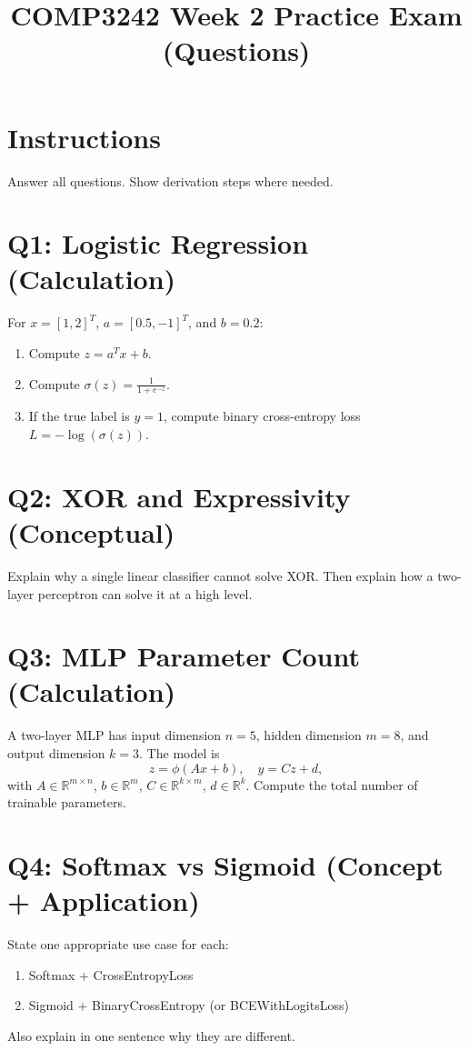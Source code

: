 \documentclass[11pt]{article}
\title{COMP3242 Week 2 Practice Exam (Questions)}
\date{}
\begin{document}
\maketitle

\section*{Instructions}
Answer all questions. Show derivation steps where needed.

\section*{Q1: Logistic Regression (Calculation)}
For $x=[1,2]^T$, $a=[0.5,-1]^T$, and $b=0.2$:
\begin{enumerate}[label=(\alph*)]
  \item Compute $z=a^Tx+b$.
  \item Compute $\sigma(z)=\frac{1}{1+e^{-z}}$.
  \item If the true label is $y=1$, compute binary cross-entropy loss 
  $L=-\log(\sigma(z))$.
\end{enumerate}

\section*{Q2: XOR and Expressivity (Conceptual)}
Explain why a single linear classifier cannot solve XOR. Then explain how a two-layer perceptron can solve it at a high level.

\section*{Q3: MLP Parameter Count (Calculation)}
A two-layer MLP has input dimension $n=5$, hidden dimension $m=8$, and output dimension $k=3$.
The model is
\[
z=\phi(Ax+b),\quad y=Cz+d,
\]
with $A\in\mathbb{R}^{m\times n}$, $b\in\mathbb{R}^{m}$, $C\in\mathbb{R}^{k\times m}$, $d\in\mathbb{R}^{k}$.
Compute the total number of trainable parameters.

\section*{Q4: Softmax vs Sigmoid (Concept + Application)}
State one appropriate use case for each:
\begin{enumerate}[label=(\alph*)]
  \item Softmax + CrossEntropyLoss
  \item Sigmoid + BinaryCrossEntropy (or BCEWithLogitsLoss)
\end{enumerate}
Also explain in one sentence why they are different.
\end{document}
